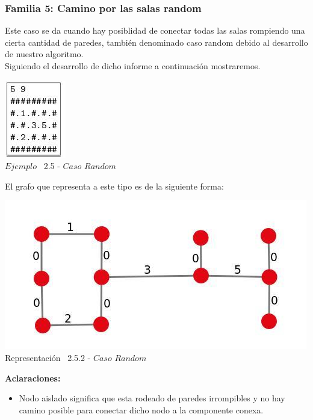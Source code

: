 \begin{center}
 \subsubsection*{Familia 5: Camino por las salas random}
\end{center}

Este caso se da cuando hay posiblidad de conectar todas las salas rompiendo una cierta cantidad de paredes, tambi\'en denominado caso random debido al desarrollo de nuestro algoritmo.\\

Siguiendo el desarrollo de dicho informe a continuaci\'on mostraremos.\\
 
\vspace*{0.3cm} \vspace*{0.3cm}
  \begin{center}
 \includegraphics[scale=1.4]{./EJ2/ej2random.jpeg}
\\ {$Ejemplo$ \ 2.5 - $Caso$ $Random$}
  \end{center}
  \vspace*{0.3cm}

El grafo que representa a este tipo es de la siguiente forma:\\

\vspace*{0.3cm} \vspace*{0.3cm}
  \begin{center}
 \includegraphics[scale=0.5]{./EJ2/ej2graforandom.jpeg}
 \\{Representación \ 2.5.2 - $Caso$ $Random$}
  \end{center}
  \vspace*{0.3cm}

\textbf{Aclaraciones:} 
\begin{itemize}
\item Nodo aislado significa que esta rodeado de paredes irrompibles y no hay camino posible para conectar dicho nodo a la componente conexa.
\end{itemize}
